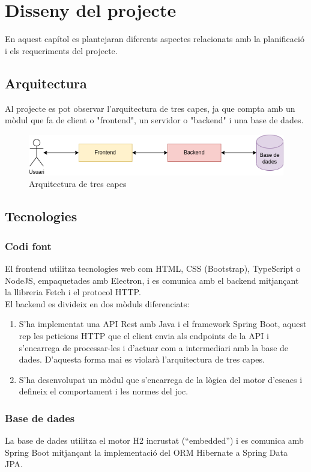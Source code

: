 \chapter{Disseny del projecte}
En aquest capítol es plantejaran diferents aspectes relacionats amb la planificació i els requeriments del projecte.
\section{Arquitectura}
Al projecte es pot observar l'arquitectura de tres capes, ja que compta amb un mòdul que fa de client o "frontend", un servidor o "backend" i una base de dades.
\begin{figure}[H]
    \centering
    \includegraphics[width=\textwidth]{images/arquitectura.png}
    \caption{Arquitectura de tres capes}
    \label{fig:Arquitectura}
\end{figure}
\section{Tecnologies}
\subsection{Codi font}
El frontend utilitza tecnologies web com HTML, CSS (Bootstrap), TypeScript o NodeJS, empaquetades amb Electron, i es comunica amb el backend mitjançant la llibreria Fetch i el protocol HTTP.
\\[3mm]
El backend es divideix en dos mòduls diferenciats:
\begin{enumerate}
    \item S'ha implementat una API Rest amb Java i el framework Spring Boot, aquest rep les peticions HTTP que el client envia als endpoints de la API i s'encarrega de processar-les i d'actuar com a intermediari amb la base de dades. D'aquesta forma mai es violarà l'arquitectura de tres capes.
    \item S'ha desenvolupat un mòdul que s'encarrega de la lògica del motor d'escacs i defineix el comportament i les normes del joc.
\end{enumerate}
\subsection{Base de dades}
La base de dades utilitza el motor H2 incrustat (“embedded”) i es comunica amb Spring Boot mitjançant la implementació del ORM Hibernate a Spring Data JPA.
